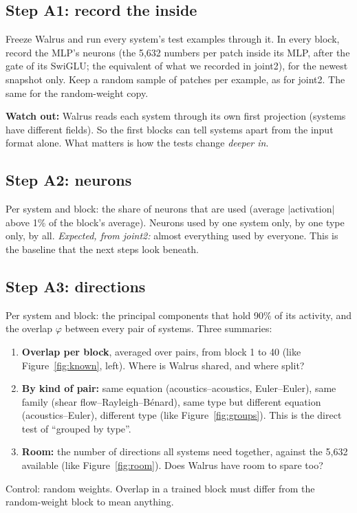 \documentclass[11pt,a4paper]{article}
\begin{document}
\subsection*{Step A1: record the inside}

Freeze Walrus and run every system's test examples through it. In every block, record the MLP's neurons
(the 5,632 numbers per patch inside its MLP, after the gate of its SwiGLU; the equivalent of what we recorded in joint2), for the newest snapshot only.
Keep a random sample of patches per example, as for joint2. The same for the random-weight copy.

\textbf{Watch out:} Walrus reads each system through its own first projection (systems have different fields).
So the first blocks can tell systems apart from the input format alone. What matters is how the tests change \emph{deeper in}.

\subsection*{Step A2: neurons}

Per system and block: the share of neurons that are used (average $|$activation$|$ above 1\% of the block's average).
Neurons used by one system only, by one type only, by all.
\emph{Expected, from joint2:} almost everything used by everyone. This is the baseline that the next steps look beneath.

\subsection*{Step A3: directions}

Per system and block: the principal components that hold 90\% of its activity, and the overlap $\varphi$ between every pair of systems.
Three summaries:
\begin{enumerate}[itemsep=0.5em]
  \item \textbf{Overlap per block}, averaged over pairs, from block 1 to 40 (like Figure~\ref{fig:known}, left).
  Where is Walrus shared, and where split?
  \item \textbf{By kind of pair:} same equation (acoustics--acoustics, Euler--Euler), same family (shear flow--Rayleigh--B\'enard),
  same type but different equation (acoustics--Euler), different type (like Figure~\ref{fig:groups}).
  This is the direct test of ``grouped by type''.
  \item \textbf{Room:} the number of directions all systems need together, against the 5,632 available (like Figure~\ref{fig:room}).
  Does Walrus have room to spare too?
\end{enumerate}
Control: random weights. Overlap in a trained block must differ from the random-weight block to mean anything.
\end{document}
